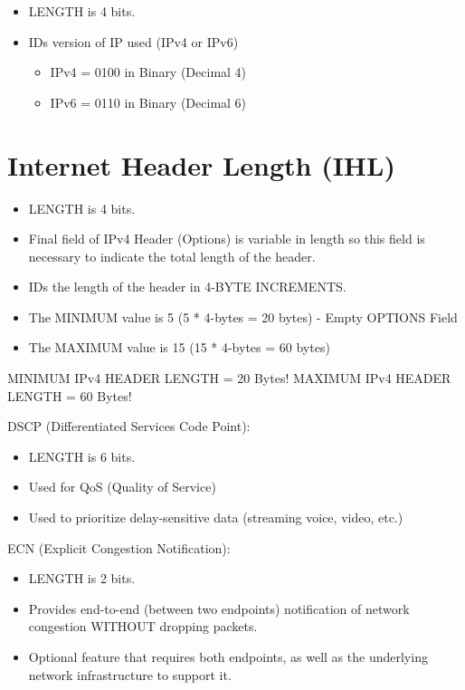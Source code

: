\begin{itemize}
\tightlist
\item
  LENGTH is 4 bits.
\item
  IDs version of IP used (IPv4 or IPv6)

  \begin{itemize}
  \tightlist
  \item
    IPv4 = 0100 in Binary (Decimal 4)
  \item
    IPv6 = 0110 in Binary (Decimal 6)
  \end{itemize}
\end{itemize}

\section{Internet Header Length (IHL)}\label{internet-header-length-ihl}

\begin{itemize}
\tightlist
\item
  LENGTH is 4 bits.
\item
  Final field of IPv4 Header (Options) is variable in length so this
  field is necessary to indicate the total length of the header.
\item
  IDs the length of the header in 4-BYTE INCREMENTS.
\item
  The MINIMUM value is 5 (5 * 4-bytes = 20 bytes) - Empty OPTIONS Field
\item
  The MAXIMUM value is 15 (15 * 4-bytes = 60 bytes)
\end{itemize}

MINIMUM IPv4 HEADER LENGTH = 20 Bytes! MAXIMUM IPv4 HEADER LENGTH = 60
Bytes!

DSCP (Differentiated Services Code Point):

\begin{itemize}
\tightlist
\item
  LENGTH is 6 bits.
\item
  Used for QoS (Quality of Service)
\item
  Used to prioritize delay-sensitive data (streaming voice, video, etc.)
\end{itemize}

ECN (Explicit Congestion Notification):

\begin{itemize}
\tightlist
\item
  LENGTH is 2 bits.
\item
  Provides end-to-end (between two endpoints) notification of network
  congestion WITHOUT dropping packets.
\item
  Optional feature that requires both endpoints, as well as the
  underlying network infrastructure to support it.
\end{itemize}

